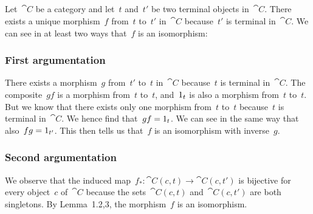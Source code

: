 \subsection{}

Let~$\cat{C}$ be a category and let~$t$ and~$t'$ be two terminal objects in~$\cat{C}$.
There exists a unique morphism~$f$ from~$t$ to~$t'$ in~$\cat{C}$ because~$t'$ is terminal in~$\cat{C}$.
We can see in at least two ways that~$f$ is an isomorphism:



\subsubsection*{First argumentation}

There exists a morphism~$g$ from~$t'$ to~$t$ in~$\cat{C}$ because~$t$ is terminal in~$\cat{C}$.
The composite~$g f$ is a morphism from~$t$ to~$t$, and~$1_t$ is also a morphism from~$t$ to~$t$.
But we know that there exists only one morphism from~$t$ to~$t$ because~$t$ is terminal in~$\cat{C}$.
We hence find that~$g f = 1_t$.
We can see in the same way that also~$f g = 1_{t'}$.
This then tells us that~$f$ is an isomorphism with inverse~$g$.



\subsubsection*{Second argumentation}

We observe that the induced map~$f_* \colon \cat{C}(c, t) \to \cat{C}(c, t')$ is bijective for every object~$c$ of~$\cat{C}$ because the sets~$\cat{C}(c, t)$ and~$\cat{C}(c, t')$ are both singletons.
By Lemma~1.2,3, the morphism~$f$ is an isomorphism.
